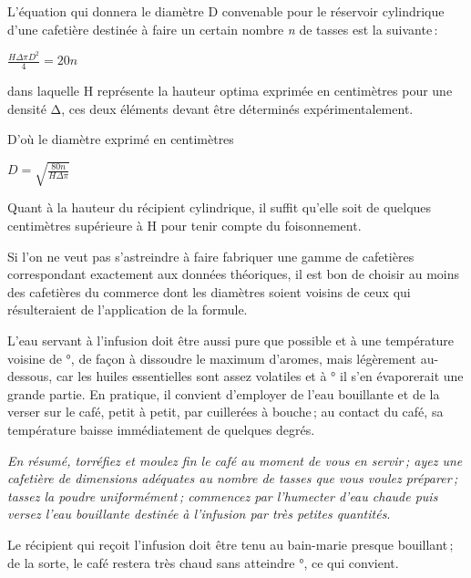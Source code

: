 L'équation qui donnera le diamètre D convenable pour le réservoir cylindrique
d'une cafetière destinée à faire un certain nombre \textit{n} de tasses est la
suivante :

\begin{center}
$ \frac{H\Delta \pi D^{2}}{4} = 20 n $
\end{center}

\normalsize

dans laquelle H représente la hauteur optima exprimée en centimètres pour une
densité Δ, ces deux éléments devant être déterminés expérimentalement.

\medskip

D'où le diamètre exprimé en centimètres

\begin{center}
$ D = \sqrt{\frac{80n}{H\Delta\pi}} $
\end{center}

Quant à la hauteur du récipient cylindrique, il suffit qu'elle soit de quelques
centimètres supérieure à H pour tenir compte du foisonnement.

Si l’on ne veut pas s'astreindre à faire fabriquer une gamme de cafetières
correspondant exactement aux données théoriques, il est bon de choisir au moins
des cafetières du commerce dont les diamètres soient voisins de ceux qui
résulteraient de l'application de la formule.

\label{pg1014} \hypertarget{p1014}{}
L'eau servant à l'infusion doit être aussi pure que possible et à une
température voisine de {\mmm}°, de façon à dissoudre le maximum
d’aromes, mais légèrement au-dessous, car les huiles essentielles sont assez
volatiles et à {\mmm}° il s'en évaporerait une grande partie. En
pratique, il convient d'employer de l'eau bouillante et de la verser sur le
café, petit à petit, par cuillerées à bouche ; au contact du café, sa
température baisse immédiatement de quelques degrés.

\textit{En résumé, torréfiez et moulez fin le café au moment de vous en
servir ; ayez une cafetière de dimensions adéquates au nombre de tasses que
vous voulez préparer ; tassez la poudre uniformément ; commencez par l'humecter
d'eau chaude puis versez l’eau bouillante destinée à l'infusion par très
petites quantités}.

Le récipient qui reçoit l'infusion doit être tenu au bain-marie presque
bouillant ; de la sorte, le café restera très chaud sans atteindre
{\mmm}°, ce qui convient.

